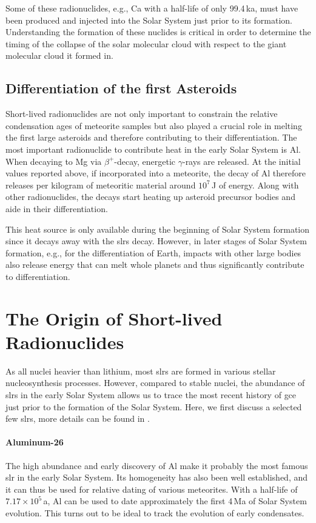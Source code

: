 Some of these radionuclides, e.g., Ca with a half-life of only 99.4\,ka, must have been produced and injected into the Solar System just prior to its formation. Understanding the formation of these nuclides is critical in order to determine the timing of the collapse of the solar molecular cloud with respect to the giant molecular cloud it formed in. 


\subsection{Differentiation of the first Asteroids}

Short-lived radionuclides are not only important to constrain the relative condensation ages of meteorite samples but also played a crucial role in melting the first large asteroids and therefore contributing to their differentiation. The most important radionuclide to contribute heat in the early Solar System is Al. When decaying to Mg via $\beta^{+}$-decay, energetic $\gamma$-rays are released. At the initial values reported above, if incorporated into a meteorite, the decay of Al therefore releases per kilogram of meteoritic material around $10^{7}$\,J of energy. Along with other radionuclides, the decays start heating up asteroid precursor bodies and aide in their differentiation. 

This heat source is only available during the beginning of Solar System formation since it decays away with the \acp{slr} decay. However, in later stages of Solar System formation, e.g., for the differentiation of Earth, impacts with other large bodies also release energy that can melt whole planets and thus significantly contribute to differentiation.

\section{The Origin of Short-lived Radionuclides}

As all nuclei heavier than lithium, most \acp{slr} are formed in various stellar nucleosynthesis processes. However, compared to stable nuclei, the abundance of \acp{slr} in the early Solar System allows us to trace the most recent history of \ac{gce} just prior to the formation of the Solar System. Here, we first discuss a selected few \acp{slr}, more details can be found in \citet{lugaro18rad}.

\paragraph{Aluminum-26} The high abundance and early discovery of Al make it probably the most famous \ac{slr} in the early Solar System. Its homogeneity has also been well established, and it can thus be used for relative dating of various meteorites. With a half-life of $7.17\times10^{5}$\,a, Al can be used to date approximately the first 4\,Ma of Solar System evolution. This turns out to be ideal to track the evolution of early condensates.

